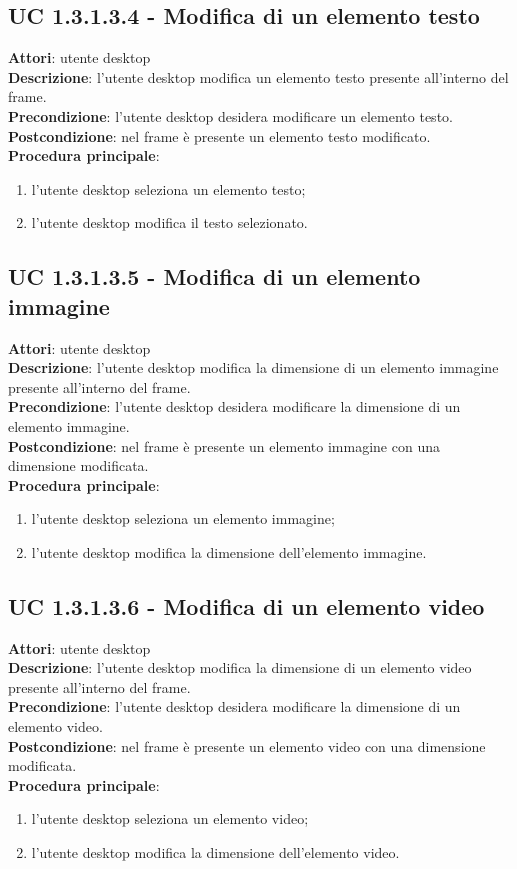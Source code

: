 \subsection{UC 1.3.1.3.4 - Modifica di un elemento testo}{
	\label{uc1.3.1.3.4}
	\textbf{Attori}: utente desktop \\
	\textbf{Descrizione}: l'utente desktop modifica un elemento testo presente all'interno del frame. \\
	\textbf{Precondizione}: l'utente desktop desidera modificare un elemento testo.	\\
	\textbf{Postcondizione}: nel frame è presente un elemento testo modificato.	\\
	\textbf{Procedura principale}:
	\begin{enumerate}
		\item l'utente desktop seleziona un elemento testo;
		\item l'utente desktop modifica il testo selezionato.
	\end{enumerate}
	}
\subsection{UC 1.3.1.3.5 - Modifica di un elemento immagine}{
	\label{uc1.3.1.3.5}
	\textbf{Attori}: utente desktop \\
	\textbf{Descrizione}: l'utente desktop modifica la dimensione di un elemento immagine presente all'interno del frame. \\
	\textbf{Precondizione}: l'utente desktop desidera modificare la dimensione di un elemento immagine.	\\
	\textbf{Postcondizione}: nel frame è presente un elemento immagine con una dimensione modificata.	\\
	\textbf{Procedura principale}:
	\begin{enumerate}
		\item l'utente desktop seleziona un elemento immagine;
		\item l'utente desktop modifica la dimensione dell'elemento immagine.
	\end{enumerate}
	}
\subsection{UC 1.3.1.3.6 - Modifica di un elemento video}{
	\label{uc1.3.1.3.6}
	\textbf{Attori}: utente desktop \\
	\textbf{Descrizione}: l'utente desktop modifica la dimensione di un elemento video presente all'interno del frame. \\
	\textbf{Precondizione}: l'utente desktop desidera modificare la dimensione di un elemento video.	\\
	\textbf{Postcondizione}: nel frame è presente un elemento video con una dimensione modificata.	\\
	\textbf{Procedura principale}:
	\begin{enumerate}
		\item l'utente desktop seleziona un elemento video;
		\item l'utente desktop modifica la dimensione dell'elemento video.
	\end{enumerate}
	}
